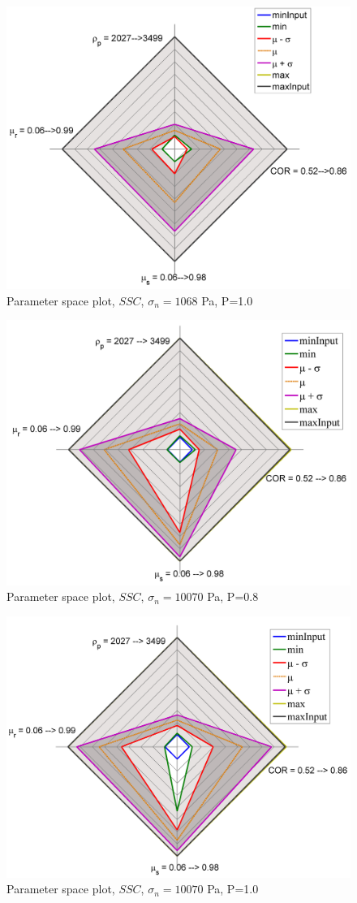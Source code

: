 \begin{figure}%
\centering 
\includegraphics[width=.48\columnwidth]{images/041radarpirker1schulze1068} 
\caption{Parameter space plot, $SSC$, $\sigma_n=1068$ Pa, P=1.0}
\label{fig:041radarpirker1schulze1068} 
\end{figure}
\begin{figure}%
\centering 
\includegraphics[width=.48\columnwidth]{images/026radarpirker08schulze10070} 
\caption{Parameter space plot, $SSC$, $\sigma_n=10070$ Pa, P=0.8}
\label{fig:026radarpirker08schulze10070} 
\end{figure}
\begin{figure}%
\centering 
\includegraphics[width=.48\columnwidth]{images/024radarpirker1schulze10070} 
\caption{Parameter space plot, $SSC$, $\sigma_n=10070$ Pa, P=1.0}
\label{fig:024radarpirker1schulze10070} 
\end{figure}
